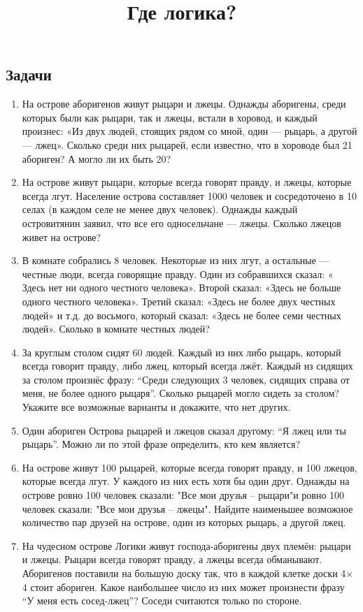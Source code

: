 \documentclass[a4paper,12pt]{article}
\title{Где логика?}
\date{}
\begin{document}
\maketitle
    \subsection*{Задачи}
    \begin{enumerate}
    \item На острове аборигенов живут рыцари и лжецы. Однажды аборигены, среди которых были как рыцари, так и лжецы, встали в хоровод, и каждый произнес: «Из двух людей, стоящих рядом со мной, один — рыцарь, а другой — лжец». Сколько среди них рыцарей, если известно, что в хороводе был 21   абориген? А могло ли их быть 20?
    \item На острове живут рыцари, которые всегда говорят правду, и лжецы, которые всегда лгут. Население острова составляет 1000 человек и сосредоточено в 10 селах (в каждом селе не менее двух человек). Однажды каждый островитянин заявил, что все его односельчане — лжецы. Сколько лжецов живет на острове?
    \item В комнате собрались 8 человек. Некоторые из них лгут, а остальные — честные люди, всегда говорящие правду. Один из собравшихся сказал: « Здесь нет ни одного честного человека». Второй сказал: «Здесь не больше одного честного человека». Третий сказал: «Здесь не более двух честных людей» и т.д. до восьмого, который сказал: «Здесь не более семи честных людей». Сколько в комнате честных людей?
    \item За круглым столом сидят 60   людей. Каждый из них либо рыцарь, который всегда говорит правду, либо лжец, который всегда лжёт. Каждый из сидящих за столом произнёс фразу: “Среди следующих 3   человек, сидящих справа от меня, не более одного рыцаря”. Сколько рыцарей могло сидеть за столом? Укажите все возможные варианты и докажите, что нет других.
    \item Один абориген Острова рыцарей и лжецов сказал другому: “Я лжец или ты рыцарь”. Можно ли по этой фразе определить, кто кем является?
    \item На острове живут 100 рыцарей, которые всегда говорят правду, и 100 лжецов, которые всегда лгут. У каждого из них есть хотя бы один друг. Однажды на острове ровно 100 человек сказали: "Все мои друзья – рыцари"и ровно 100 человек сказали: "Все мои друзья – лжецы". Найдите наименьшее возможное количество пар друзей на острове, один из которых рыцарь, а другой лжец.
    \item На чудесном острове Логики живут господа-аборигены двух племён: рыцари и лжецы. Рыцари всегда говорят правду, а лжецы всегда обманывают. Аборигенов поставили на большую доску так, что в каждой клетке доски 4× 4   стоит абориген. Какое наибольшее число из них может произнести фразу “У меня есть сосед-лжец”? Соседи считаются только по стороне.

\end{enumerate}
\end{document}

